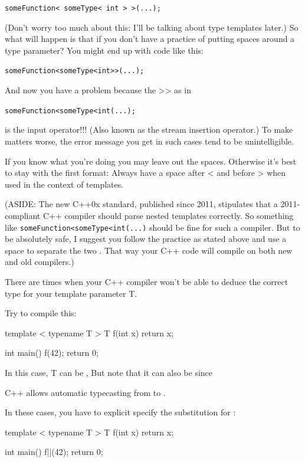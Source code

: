 \verb!someFunction< someType< int > >(...);!

(Don't worry too much about this: I'll be talking about type templates
later.) So what will happen is that if you don't have a
practice of putting spaces around a type parameter? You might end up
with code like this:

\verb!someFunction<someType<int>>(...);!

And now you have a problem because the >> as in

\texttt{someFunction<someType<int\EMPHASIZE{>>}(...);}

is the input operator!!! (Also known as the stream insertion operator.)
To make matters worse, the error message you get in such cases tend to
be unintelligible.

If you know what you're doing you may leave out the
spaces. Otherwise it's best to stay with the first
format: Always have a space after < and before >
when used in the context of templates.

(ASIDE: The new C++0x standard, published since 2011, stipulates that a
2011-compliant C++ compiler should parse nested templates correctly. So
something like \texttt{someFunction<someType<int\EMPHASIZE{>>}(...)} should be fine for such a compiler. But to be absolutely safe, I suggest you follow the practice as stated above and use a space to separate the two \EMPHASIZE{>>}. That way your C++ code will compile on both new and old compilers.)


\newpage{}

There are times when your C++ compiler won't be able to deduce the
correct type for your template parameter T.

Try to compile this:

\begin{consolethree}[escapeinside=||]
template < typename T >
T f(int x)
{
    return x;
}

int main()
{
    f(42);
    return 0;
}
\end{consolethree}

In this case, T can be , But note that it can also be
 since

C++ allows automatic typecasting from  to
.

In these cases, you have to explicit specify the substitution for
:

\begin{consolethree}[escapeinside=||]
template < typename T >
T f(int x)
{
    return x;
}

int main()
{
    f||(42);
    return 0;
}
\end{consolethree}


